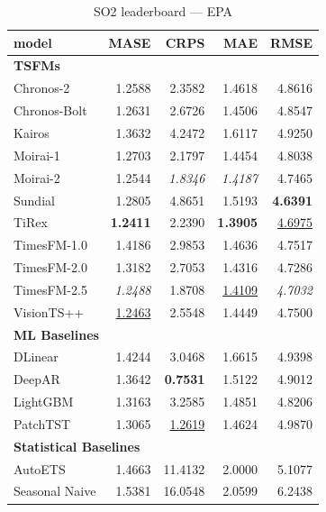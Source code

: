 \begin{table}[H]
\caption{SO2 leaderboard --- EPA}
\centering
\begin{small}
\begin{tabular}{lrrrr}
\toprule
model & MASE & CRPS & MAE & RMSE \\
\midrule
\multicolumn{5}{l}{\textbf{TSFMs}} \\
Chronos-2 & 1.2588 & 2.3582 & 1.4618 & 4.8616 \\
Chronos-Bolt & 1.2631 & 2.6726 & 1.4506 & 4.8547 \\
Kairos & 1.3632 & 4.2472 & 1.6117 & 4.9250 \\
Moirai-1 & 1.2703 & 2.1797 & 1.4454 & 4.8038 \\
Moirai-2 & 1.2544 & \textit{1.8346} & \textit{1.4187} & 4.7465 \\
Sundial & 1.2805 & 4.8651 & 1.5193 & \textbf{4.6391} \\
TiRex & \textbf{1.2411} & 2.2390 & \textbf{1.3905} & \underline{4.6975} \\
TimesFM-1.0 & 1.4186 & 2.9853 & 1.4636 & 4.7517 \\
TimesFM-2.0 & 1.3182 & 2.7053 & 1.4316 & 4.7286 \\
TimesFM-2.5 & \textit{1.2488} & 1.8708 & \underline{1.4109} & \textit{4.7032} \\
VisionTS++ & \underline{1.2463} & 2.5548 & 1.4449 & 4.7500 \\
\midrule
\multicolumn{5}{l}{\textbf{ML Baselines}} \\
DLinear & 1.4244 & 3.0468 & 1.6615 & 4.9398 \\
DeepAR & 1.3642 & \textbf{0.7531} & 1.5122 & 4.9012 \\
LightGBM & 1.3163 & 3.2585 & 1.4851 & 4.8206 \\
PatchTST & 1.3065 & \underline{1.2619} & 1.4624 & 4.9870 \\
\midrule
\multicolumn{5}{l}{\textbf{Statistical Baselines}} \\
AutoETS & 1.4663 & 11.4132 & 2.0000 & 5.1077 \\
Seasonal Naive & 1.5381 & 16.0548 & 2.0599 & 6.2438 \\
\bottomrule
\end{tabular}
\end{small}
\end{table}